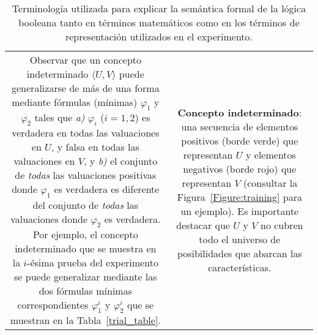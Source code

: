 \begin{table}[]
\begin{tabular}{c|c}
\begin{minipage}[t]{0.45\textwidth}
Observar que un concepto indeterminado $ \langle U, V \rangle $ puede generalizarse de más de una forma mediante fórmulas (mínimas) $ \varphi_1 $ y $ \varphi_2 $ tales que {\em a)} $ \varphi_i $ ($ i = 1,2 $) es verdadera en todas las valuaciones en $ U $, y falsa en todas las valuaciones en $ V $, y {\em b)} el conjunto de {\em todas} las valuaciones positivas donde $ \varphi_1 $ es verdadera es diferente del conjunto de {\em todas} las valuaciones donde $ \varphi_2 $ es verdadera. Por ejemplo, el concepto indeterminado que se muestra en la $ i $-ésima prueba del experimento se puede generalizar mediante las dos fórmulas mínimas correspondientes $ \varphi^i_1 $ y $ \varphi^i_2 $ que se muestran en la Tabla~\ref{trial_table}.
\end{minipage}
&
\begin{minipage}[t]{0.45\textwidth}
{\bf Concepto indeterminado}: una secuencia de elementos positivos (borde verde) que representan $ U $ y elementos negativos (borde rojo) que representan $ V $ (consultar la Figura~\ref{Figure:training} para un ejemplo). Es importante destacar que $ U $ y $ V $ no cubren todo el universo de posibilidades que abarcan las características.\end{minipage}
\end{tabular}
\caption {Terminología utilizada para explicar la semántica formal de la lógica booleana tanto en términos matemáticos como en los términos de representación utilizados en el experimento.}
\label{tab:glosario}
\end{table}


\color{black}

      